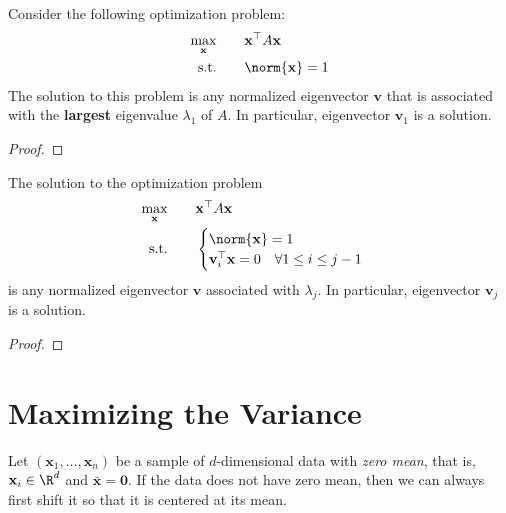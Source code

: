 \documentclass[color=blue, thmcnt=section, 12pt]{elegantbook}
\begin{document}
\begin{theorem} \label{thm:1}
    Consider the following optimization problem: 
    \begin{alignat*}{2}
        \max_{\mathbf{x}}&\quad & &\mathbf{x}^\top A \mathbf{x} \\ 
        \text{s.t.}& & &\norm{\mathbf{x}} = 1
    \end{alignat*}
    The solution to this problem is any normalized eigenvector $\mathbf{v}$ that is associated with the \textbf{largest} eigenvalue $\lambda_1$ of $A$. In particular, eigenvector $\mathbf{v}_1$ is a solution.
\end{theorem}

\begin{proof}
\end{proof}


\begin{theorem} \label{thm:2}
    The solution to the optimization problem
    \begin{alignat*}{2}
        \max_{\mathbf{x}}&\quad & &\mathbf{x}^\top A \mathbf{x} \\ 
        \text{s.t.}& & &\begin{cases}
            \norm{\mathbf{x}} = 1\\ 
            \mathbf{v}_i^\top \mathbf{x} = 0
            \quad \forall 1 \leq i \leq j-1
        \end{cases}
    \end{alignat*}
    is any normalized eigenvector $\mathbf{v}$ associated with $\lambda_j$. In particular, eigenvector $\mathbf{v}_j$ is a solution.
\end{theorem}

\begin{proof}
\end{proof}


\section{Maximizing the Variance}


\par Let $(\mathbf{x}_1, \ldots, \mathbf{x}_n)$ be a sample of $d$-dimensional data with \textit{zero mean}, that is, $\mathbf{x}_i \in \R^d$ and $\bar{\mathbf{x}} = \mathbf{0}$. If the data does not have zero mean, then we can always first shift it so that it is centered at its mean. 
\end{document}
